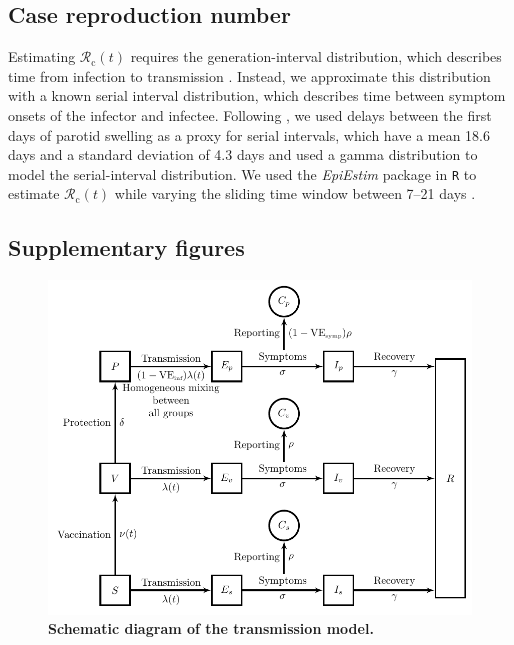 \documentclass[12pt]{article}
\providecommand{\DIFaddend}{} %
\DeclareRobustCommand{\DIFaddend}{\DIFOaddend \let\includegraphics\DIFOincludegraphics} %
\begin{document}
\DIFaddend \subsection*{Case reproduction number}

Estimating $\mathcal{R}_{\mathrm c}(t)$ requires the generation-interval distribution, which describes time from infection to transmission \citep{gostic2020}. 
Instead, we approximate this distribution with a known serial interval distribution, which describes time between symptom onsets of the infector and infectee.
Following \cite{simpson1952infectiousness}, we used delays between the first days of parotid swelling as a proxy for serial intervals, which have a mean 18.6 days and a standard deviation of 4.3 days
and used a gamma distribution to model the serial-interval distribution.
We used the \textit{EpiEstim} package in \texttt{R} to estimate $\mathcal{R}_{\mathrm c}(t)$ while varying the sliding time window between 7--21 days \citep{cori2013new}.

\pagebreak

\subsection*{Supplementary figures}
\setcounter{figure}{0}
\renewcommand{\thefigure}{S\arabic{figure}}


\begin{figure}[!th]
\includegraphics[width=\textwidth]{../figure/diagram.pdf}
\caption{
\textbf{Schematic diagram of the transmission model.}
}
\label{fig:model}
\end{figure}
\end{document}
